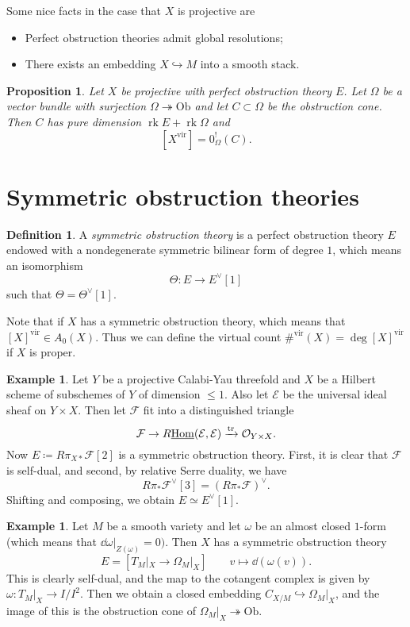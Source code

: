 \documentclass[leqno, openany]{memoir}
\newtheorem{prop}[thm]{Proposition}
\theoremstyle{definition}
\newtheorem{defn}[thm]{Definition}
\newtheorem{exm}[thm]{Example}
\theoremstyle{remark}
\theoremstyle{plain}
\theoremstyle{definition}
\theoremstyle{remark}
\newcommand{\mc}[1]{\mathcal{#1}}
\newcommand{\mr}[1]{\mathrm{#1}}
\newcommand{\on}[1]{\operatorname{#1}}
\newcommand{\ul}[1]{\underline{#1}}
\DeclareMathOperator{\Hom}{Hom}
\begin{document}
Some nice facts in the case that $X$ is projective are
\begin{itemize}
    \item Perfect obstruction theories admit global resolutions;
    \item There exists an embedding $X \hookrightarrow M$ into a smooth stack.
\end{itemize}

\begin{prop}
    Let $X$ be projective with perfect obstruction theory $E$. Let $\Omega$ be a vector bundle with surjection $\Omega \twoheadrightarrow \mr{Ob}$ and let $C \subset \Omega$ be the obstruction cone. Then $C$ has pure dimension $\on{rk} E + \on{rk} \Omega$ and 
    \[ [X^{\mr{vir}}] = 0^!_{\Omega}(C). \]
\end{prop}

\section{Symmetric obstruction theories}

\begin{defn}
    A \textit{symmetric obstruction theory} is a perfect obstruction theory $E$ endowed with a nondegenerate symmetric bilinear form of degree $1$, which means an isomorphism
    \[ \Theta \colon E \to E^{\vee}[1] \]
    such that $\Theta = \Theta^{\vee}[1]$.
\end{defn}

Note that if $X$ has a symmetric obstruction theory, which means that $[X]^{\mr{{vir}}} \in A_0(X)$. Thus we can define the virtual count $\#^{\mr{vir}}(X) = \deg [X]^{\mr{vir}}$ if $X$ is proper.

\begin{exm}
    Let $Y$ be a projective Calabi-Yau threefold and $X$ be a Hilbert scheme of subschemes of $Y$ of dimension $\leq 1$. Also let $\mc{E}$ be the universal ideal sheaf on $Y \times X$. Then let $\mc{F}$ fit into a distinguished triangle
    \[ \mc{F} \to R\ul{\Hom}(\mc{E}, \mc{E}) \xrightarrow{\tr} \mc{O}_{Y \times X}. \]
    Now $E \coloneqq R \pi_{X*} \mc{F}[2]$ is a symmetric obstruction theory. First, it is clear that $\mc{F}$ is self-dual, and second, by relative Serre duality, we have
    \[ R \pi_* \mc{F}^{\vee}[3] = (R \pi_* \mc{F})^{\vee}. \]
    Shifting and composing, we obtain $E \simeq E^{\vee}[1]$.
\end{exm}

\begin{exm}
    Let $M$ be a smooth variety and let $\omega$ be an almost closed $1$-form (which means that $\dd{\omega}|_{Z(\omega)} = 0)$. Then $X$ has a symmetric obstruction theory
    \[ E = [T_M |_X \to \Omega_M |_X] \qquad v \mapsto \dd(\omega(v)). \]
    This is clearly self-dual, and the map to the cotangent complex is given by $\omega \colon T_M |_X \to I/I^2$. Then we obtain a closed embedding $C_{X/M} \hookrightarrow \Omega_M |_X$, and the image of this is the obstruction cone of $\Omega_M |_X \twoheadrightarrow \mr{Ob}$.
\end{exm}
\end{document}
